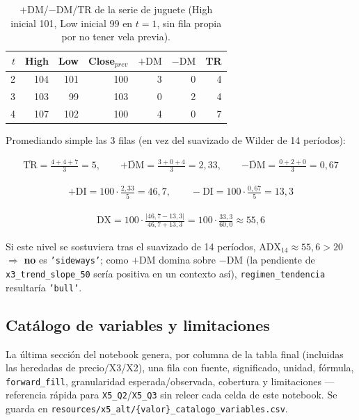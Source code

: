 \documentclass[11pt,a4paper]{article}
\newcommand{\code}[1]{\texttt{\small #1}}
\begin{document}
\begin{table}[h]
\centering
\small
\begin{tabular}{@{}r r r r r r r@{}}
\toprule
\(t\) & High & Low & Close\(_{prev}\) & \(+\mathrm{DM}\) & \(-\mathrm{DM}\) & TR \\
\midrule
2 & 104 & 101 & 100 & 3 & 0 & 4 \\
3 & 103 & 99  & 103 & 0 & 2 & 4 \\
4 & 107 & 102 & 100 & 4 & 0 & 7 \\
\bottomrule
\end{tabular}
\caption{\(+\mathrm{DM}\)/\(-\mathrm{DM}\)/TR de la serie de juguete (High inicial 101,
Low inicial 99 en \(t{=}1\), sin fila propia por no tener vela previa).}
\end{table}

Promediando simple las 3 filas (en vez del suavizado de Wilder de 14 períodos):

\begin{align}
\overline{\mathrm{TR}} = \frac{4+4+7}{3} = 5, \qquad
\overline{{+}\mathrm{DM}} = \frac{3+0+4}{3} = 2{,}33, \qquad
\overline{{-}\mathrm{DM}} = \frac{0+2+0}{3} = 0{,}67
\end{align}

\begin{align}
{+}\mathrm{DI} = 100 \cdot \frac{2{,}33}{5} = 46{,}7, \qquad
{-}\mathrm{DI} = 100 \cdot \frac{0{,}67}{5} = 13{,}3
\end{align}

\begin{align}
\mathrm{DX} = 100 \cdot \frac{|46{,}7 - 13{,}3|}{46{,}7 + 13{,}3} = 100 \cdot
  \frac{33{,}3}{60{,}0} \approx 55{,}6
\end{align}

Si este nivel se sostuviera tras el suavizado de 14 períodos, \(\mathrm{ADX}_{14}
\approx 55{,}6 > 20\) \(\Rightarrow\) \textbf{no} es \code{'sideways'}; como
\(+\mathrm{DM}\) domina sobre \(-\mathrm{DM}\) (la pendiente de \code{x3\_trend\_slope\_50}
sería positiva en un contexto así), \code{regimen\_tendencia} resultaría \code{'bull'}.

\subsection{Catálogo de variables y limitaciones}

La última sección del notebook genera, por columna de la tabla final (incluidas las
heredadas de precio/X3/X2), una fila con fuente, significado, unidad, fórmula,
\code{forward\_fill}, granularidad esperada/observada, cobertura y limitaciones —
referencia rápida para \code{X5\_Q2}/\code{X5\_Q3} sin releer cada celda de este notebook.
Se guarda en \code{resources/x5\_alt/\{valor\}\_catalogo\_variables.csv}.
\end{document}
